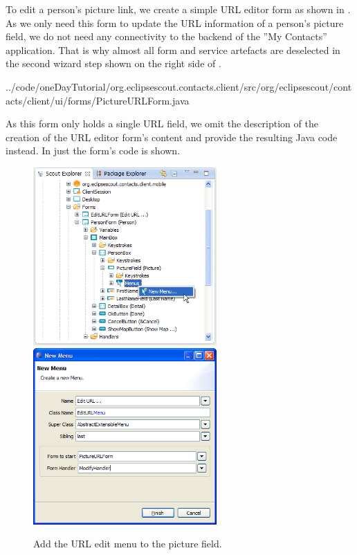 \documentclass[a4paper,10pt,twoside]{book}
\begin{document}
To edit a person's picture link, we create a simple URL editor form as shown in . 
As we only need this form to update the URL information of a person's picture field, we do not need any connectivity to the backend of the ''My Contacts'' application. 
That is why almost all form and service artefacts are deselected in the second wizard step shown on the right side of . 


{../code/oneDayTutorial/org.eclipsescout.contacts.client/src/org/eclipsescout/contacts/client/ui/forms/PictureURLForm.java}

As this form only holds a single URL field, we omit the description of the creation of the URL editor form's content and provide the resulting Java code instead. 
In  just the form's  code is shown. 

\begin{figure}
\includegraphics[width=7cm]{new_menu_editurl_contextmenu.png} \hspace{5mm}
\includegraphics[width=7cm]{new_menu_editurl.png}
\caption{Add the URL edit menu to the picture field.}
\end{figure}
\end{document}
